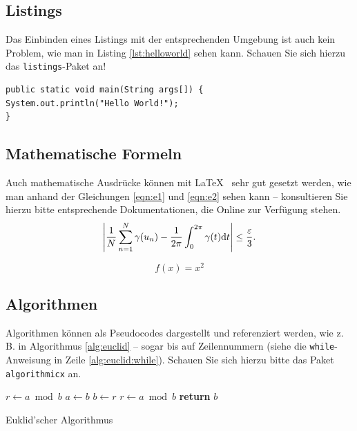 \subsection{Listings}	

Das Einbinden eines Listings mit der entsprechenden Umgebung ist auch kein Problem, wie man in Listing \vref{lst:helloworld} sehen kann. Schauen Sie sich hierzu das \texttt{listings}-Paket an! 

\newpage


\lstset{language=Java}
\begin{lstlisting}[caption={Hello World!}, label={lst:helloworld}]
public static void main(String args[]) {
System.out.println("Hello World!");
}
\end{lstlisting}


\subsection{Mathematische Formeln}
Auch mathematische Ausdrücke können mit \LaTeX~ sehr gut gesetzt werden, wie man anhand der Gleichungen \vref{eqn:e1} und \vref{eqn:e2} sehen kann -- konsultieren Sie hierzu bitte entsprechende Dokumentationen, die Online zur Verfügung stehen.
\begin{equation}
\left|{1\over N}\sum_{n=1}^N \gamma(u_n)-{1\over 2\pi}\int_0^{2\pi}\gamma(t){\rm d}t\right| \le {\varepsilon\over 3}.\\
\label{eqn:e1}
\end{equation}

\begin{equation}
f(x)=x^2
\label{eqn:e2}
\end{equation}


\subsection{Algorithmen}
Algorithmen können als Pseudocodes dargestellt und referenziert werden, wie z.\,B. in Algorithmus \vref{alg:euclid} -- sogar bis auf Zeilennummern
(siehe die \texttt{while}-Anweisung in Zeile \vref{alg:euclid:while}). Schauen Sie sich hierzu bitte das Paket \texttt{algorithmicx} an.



\begin{algorithm}
	\begin{algorithmic}[1]
		\State $r\gets a\bmod b$
		 \label{alg:euclid:while}
		\State $a\gets b$
		\State $b\gets r$
		\State $r\gets a\bmod b$
		\EndWhile\label{euclidendwhile}
		\State \textbf{return} $b$
		\EndProcedure
	\end{algorithmic}
	\caption{Euklid'scher Algorithmus}\label{alg:euclid}
\end{algorithm}
	